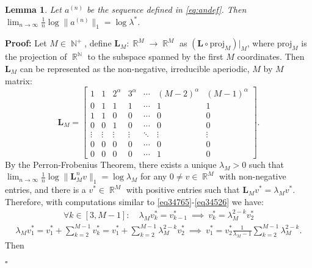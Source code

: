\documentclass[a4paper, 11pt]{article}
\newenvironment{Proof}{\noindent \textbf{Proof:}}{\hfill$\square$\\}
\DeclareMathOperator{\N}{\mathbb{N}}
\DeclareMathOperator{\R}{\mathbb{R}}
\numberwithin{equation}{section}
\theoremstyle{plain}
\newtheorem{lemma}[theorem]{Lemma}
\theoremstyle{remark}
\theoremstyle{definition}
\begin{document}
\begin{lemma}\label{ex2lemma2}
Let $a^{(n)}$ be the sequence defined in \eqref{eq:andef}. Then $\lim_{n\to\infty}\frac{1}{n}\log\|a^{(n)}\|_1 = \log \lambda^*$.
\end{lemma}

\begin{Proof}
	Let $M \in \N^+$, define $\mathbf{L}_M:\R^M \to \R^M$ as $(\mathbf{L} \circ \text{proj}_M)|_M$, where $\text{proj}_M$ is the projection of $\R^{\N}$ to the subspace spanned by the first $M$ coordinates. Then $\mathbf{L}_M$ can be represented as the non-negative, irreducible aperiodic, $M$ by $M$ matrix:
\begin{equation*}
\mathbf{L}_M = \begin{bmatrix}
1 & 1 & 2^\alpha & 3^\alpha & \cdots & (M-2)^\alpha & (M-1)^\alpha\\
0 & 1 & 1 & 1 & \cdots & 1 & 1 \\
1 & 1 & 0 & 0 & \cdots & 0 & 0 \\
0 & 0 & 1 & 0 & \cdots & 0 & 0 \\
\vdots & \vdots & \vdots & \vdots & \ddots & \vdots & \vdots\\
0 & 0 & 0 & 0 & \cdots & 0 & 0 \\
0 & 0 & 0 & 0 & \cdots & 1 & 0
\end{bmatrix}.
\end{equation*}
By the Perron-Frobenius Theorem, there exists a unique $\lambda_M > 0$ such that $\lim_{n \to \infty}\frac{1}{n}\log \|\mathbf{L}_M^nv\|_1 = \log \lambda_M$ for any $0 \neq v \in \R^M$ with non-negative entries, and there is a $v^* \in \R^M$ with positive entries such that $\mathbf{L}_Mv^* = \lambda_Mv^*$. Therefore, with computations similar to \eqref{eq34765}-\eqref{eq34526} we have:
\begin{equation*}\begin{aligned}
\forall k \in [3,M-1]: \quad \lambda_M v_k^* = v_{k-1}^* \ \implies \ v_k^* = \lambda_M^{2-k}v^*_2
\end{aligned}\end{equation*}
\begin{equation*}\begin{aligned}
\lambda_M v_1^* = v^*_1 + \sum_{k=2}^{M-1} v^*_k = v^*_1 + \sum_{k=2}^{M-1} \lambda_M^{2-k}v^*_2 \ \implies \ v^*_1 = v^*_2\frac{1}{\lambda_M-1}\sum_{k=2}^{M-1} \lambda_M^{2-k}.
\end{aligned}\end{equation*}
Then
\begin{align*}

\end{align*}
\end{Proof}
\end{document}
